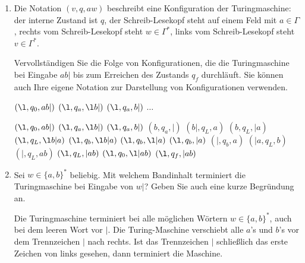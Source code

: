\documentclass{bschlangaul-aufgabe}
\begin{document}
\begin{enumerate}


\item Die Notation $(v,q,aw)$ beschreibt eine Konfiguration der
Turingmaschine: der interne Zustand ist $q$, der Schreib-Lesekopf steht
auf einem Feld mit $a \in \Gamma$, rechts vom Schreib-Lesekopf steht $w
\in \Gamma^*$, links vom Schreib-Lesekopf steht $v \in \Gamma^*$.

Vervollständigen Sie die Folge von Konfigurationen, die die
Turingmaschine bei Eingabe $ab|$ bis zum Erreichen des Zustands $q_f$
durchläuft. Sie können auch Ihre eigene Notation zur Darstellung von
Konfigurationen verwenden.

\setlength{\leftskip}{3cm}

$(\l, q_0, a b | )$ \p
$(\l, q_a, \l b | )$ \p
$(\l, q_a, b | )$ \p
$\dots$

\setlength{\leftskip}{0pt}

\begin{liAntwort}
$(\l, q_0, a b | )$ \p %
$(\l, q_a, \l b | )$ \p %
$(\l, q_a, b | )$ \p %
$(b, q_a, |)$ \p %
$(b|, q_L, a)$ \p %
$(b, q_L, | a)$ \p %
$(\l, q_L, \l b | a)$ \p %
$(\l, q_b, \l b | a)$ \p %
$(\l, q_b, \l | a)$ \p %
$(\l, q_b, | a)$ \p %
$(|, q_b, a)$ \p %
$(|a, q_L, b)$ \p %
$(|, q_L, a b)$ \p %
$(\l, q_L, | a b)$ \p %
$(\l, q_0, \l | a b)$ \p %
$(\l, q_f, | a b)$ %
\end{liAntwort}


\item Sei $w \in \{ a, b \}^*$ beliebig. Mit welchem Bandinhalt
terminiert die Turingmaschine bei Eingabe von $w|$? Geben Sie auch eine
kurze Begründung an.

\begin{liAntwort}
Die Turingmaschine terminiert bei alle möglichen Wörtern $w \in \{ a, b
\}^*$, auch bei dem leeren Wort vor $|$. Die Turing-Maschine verschiebt
alle $a$’s und $b$’s vor dem Trennzeichen $|$ nach rechts.
Ist das Trennzeichen $|$ schließlich das erste Zeichen von links
gesehen, dann terminiert die Maschine.
\end{liAntwort}
\end{enumerate}
\end{document}
